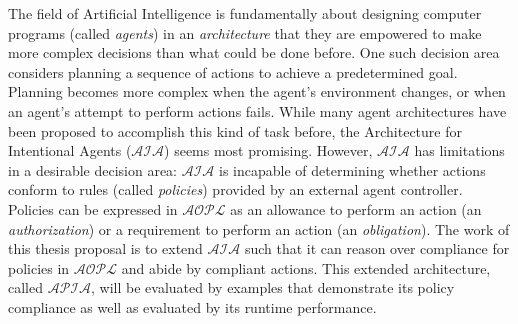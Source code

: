 The field of Artificial Intelligence is fundamentally about designing computer programs (called \textit{agents}) in an \textit{architecture} that they are empowered to make more complex decisions than what could be done before.
One such decision area considers planning a sequence of actions to achieve a predetermined goal.
Planning becomes more complex when the agent's environment changes, or when an agent's attempt to perform actions fails.
While many agent architectures have been proposed to accomplish this kind of task before, the Architecture for Intentional Agents ($\mathcal{AIA}$) seems most promising.
However, $\mathcal{AIA}$ has limitations in a desirable decision area: $\mathcal{AIA}$ is incapable of determining whether actions conform to rules (called \textit{policies}) provided by an external agent controller.
Policies can be expressed in $\mathcal{AOPL}$ as an allowance to perform an action (an \textit{authorization}) or a requirement to perform an action (an \textit{obligation}).
The work of this thesis proposal is to extend $\mathcal{AIA}$ such that it can reason over compliance for policies in $\mathcal{AOPL}$ and abide by compliant actions.
This extended architecture, called $\mathcal{APIA}$, will be evaluated by examples that demonstrate its policy compliance as well as evaluated by its runtime performance.
